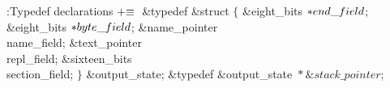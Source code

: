 \Y\B\4:Typedef declarations\X${}\mathrel+\equiv{}$\6
\&{typedef} \&{struct} ${}\{{}$\1\6
\&{eight\_bits} ${}{*}\\{end\_field}{}$;\6
\&{eight\_bits} ${}{*}\\{byte\_field}{}$;\6
\&{name\_pointer} \\{name\_field};\6
\&{text\_pointer} \\{repl\_field};\6
\&{sixteen\_bits} \\{section\_field};\2\6
${}\}{}$ \&{output\_state};\6
\&{typedef} \&{output\_state} ${}{*}\&{stack\_pointer}{}$;\par
\fi

